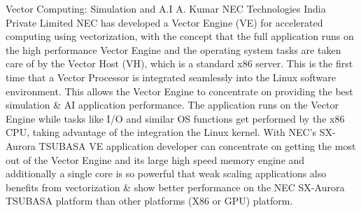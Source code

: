 
    \begin{abstract_online}{Vector Computing: Simulation and A.I}{%
        A. Kumar}{%
        \STtag}{%
        NEC Technologies India Private Limited}
    NEC has developed a Vector Engine (VE) for accelerated computing using vectorization, with the concept that the full application runs on the high performance Vector Engine and the operating system tasks are taken care of by the Vector Host (VH), which is a standard x86 server. This is the first time that a Vector Processor is integrated seamlessly into the Linux software environment. This allows the Vector Engine to concentrate on providing the best simulation & AI application performance. The application runs on the Vector Engine while tasks like I/O and similar OS functions get performed by the x86 CPU, taking advantage of the integration the Linux kernel. With NEC’s SX-Aurora TSUBASA VE application developer can concentrate on getting the most out of the Vector Engine and its large high speed memory engine and additionally a single core is so powerful that weak scaling applications also benefits from vectorization & show better performance on the NEC SX-Aurora TSUBASA platform than other platforms (X86 or GPU) platform. 
    
    \end{abstract_online}
    